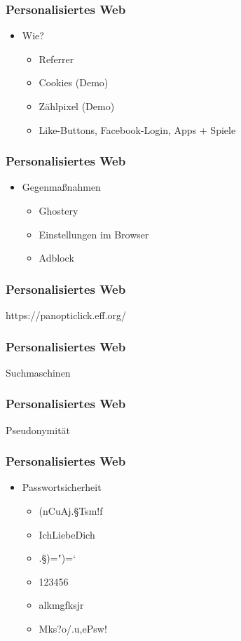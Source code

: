 \documentclass[12pt]{beamer}
\begin{document}
\begin{frame}
  \frametitle{Personalisiertes Web}
  \begin{itemize}
    \item<1-> Wie?
      \begin{itemize}
        \item<2-> Referrer
        \item<3-> Cookies (Demo)
        \item<4-> Zählpixel (Demo)
        \item<5-> Like-Buttons, Facebook-Login, Apps + Spiele
      \end{itemize}
  \end{itemize}
\end{frame}

\begin{frame}
  \frametitle{Personalisiertes Web}
  \begin{itemize}
    \item<1-> Gegenmaßnahmen 
      \begin{itemize}
        \item<2-> Ghostery
        \item<3-> Einstellungen im Browser
        \item<4-> Adblock
      \end{itemize}
  \end{itemize}
\end{frame}

\begin{frame}
  \frametitle{Personalisiertes Web}
  \begin{center} \Large
    https://panopticlick.eff.org/
  \end{center}
\end{frame}

\begin{frame}
  \frametitle{Personalisiertes Web}
  \begin{center} \Large
    Suchmaschinen
  \end{center}
\end{frame}

\begin{frame}
  \frametitle{Personalisiertes Web}
  \begin{center} \Large
     Pseudonymität
  \end{center}
\end{frame}

\begin{frame}
  \frametitle{Personalisiertes Web}
  \begin{itemize}
    \item Passwortsicherheit 
      \begin{itemize}
        \item (nCuAj.§Tsm!f
        \item IchLiebeDich
        \item .§)=")=`
        \item 123456
        \item alkmgfksjr
        \item Mks?o/.u,ePsw!
      \end{itemize}
  \end{itemize}
\end{frame}
\end{document}
